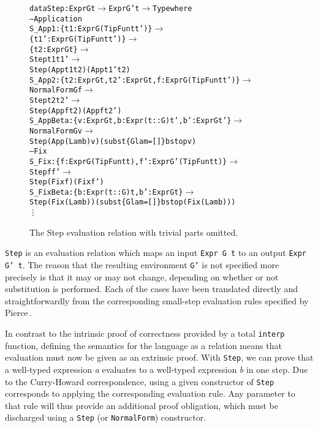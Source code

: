 \begin{figure}
\begin{alltt}
  data Step : Expr G t \(\rightarrow\) Expr G' t \(\rightarrow\) Type where
      -- Application
      S_App1    : \{t1: Expr G (TipFun t t')\} \(\to\) 
                  \{t1': Expr G (TipFun t t')\} \(\to\) 
                  \{t2: Expr G t\} \(\rightarrow\)
                  Step t1 t1' \(\rightarrow\)
                  Step (App t1 t2) (App t1' t2)
      S_App2    : \{t2: Expr G t, t2': Expr G t, f: Expr G (TipFun t t')\} \(\rightarrow\)
                  NormalForm G f \(\rightarrow\)
                  Step t2 t2' \(\rightarrow\)
                  Step (App f t2) (App f t2')
      S_AppBeta : \{v: Expr G t, b: Expr (t :: G) t', b': Expr G t'\} \(\rightarrow\)
                  NormalForm G v \(\rightarrow\)
                  Step (App (Lam b) v) (subst \{Glam=[]\} b stop v)
      -- Fix
      S_Fix     : \{f: Expr G (TipFun t t), f': Expr G' (TipFun t t)\} \(\rightarrow\)
                  Step f f' \(\rightarrow\)
                  Step (Fix f) (Fix f')
      S_FixBeta : \{b: Expr (t :: G) t, b': Expr G t\} \(\rightarrow\)
                  Step (Fix (Lam b)) (subst \{Glam=[]\} b stop (Fix (Lam b)))
      \vdots
\end{alltt}
\caption{The Step evaluation relation with trivial parts omitted.}
\label{fig:step-relation}
\end{figure}

\texttt{Step} is an evaluation relation which maps an input \texttt{Expr G t} to an output \texttt{Expr G' t}. The reason that the resulting environment \texttt{G'} is not specified more precisely is that it may or may not change, depending on whether or not substitution is performed. Each of the cases have been translated directly and straightforwardly from the corresponding small-step evaluation rules specified by Pierce\,\cite{Pierce:TypeSystems}.

In contrast to the intrinsic proof of correctness provided by a total \texttt{interp} function, defining the semantics for the language as a relation means that evaluation must now be given as an extrinsic proof. With \texttt{Step}, we can prove that a well-typed expression \textit{a} evaluates to a well-typed expression \textit{b} in one step. Due to the Curry-Howard correspondence, using a given constructor of \texttt{Step} corresponds to applying the corresponding evaluation rule. Any parameter to that rule will thus provide an additional proof obligation, which must be discharged using a \texttt{Step} (or \texttt{NormalForm}) constructor.


